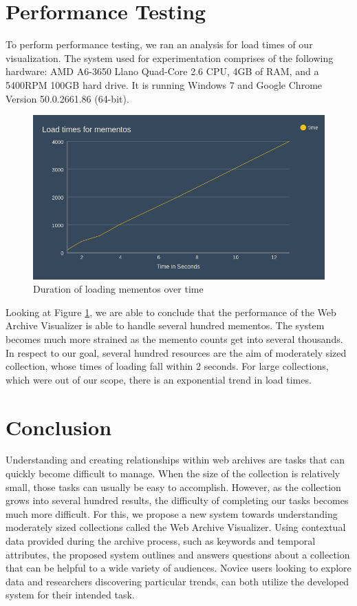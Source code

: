 \documentclass[10pt,journal,compsoc]{IEEEtran}
\begin{document}
\section{Performance Testing}

To perform performance testing, we ran an analysis for load times of our visualization. The system used for experimentation comprises of the following hardware: AMD A6-3650 Llano Quad-Core 2.6 CPU, 4GB of RAM, and a 5400RPM 100GB hard drive. It is running Windows 7 and Google Chrome Version 50.0.2661.86 (64-bit). \par

\begin{figure}[b]
\centering
\includegraphics[scale=0.3]{Figure5}
\caption{Duration of loading mementos over time}
\label{fig:mesh4}
\end{figure}

Looking at Figure \ref{fig:mesh4}, we are able to conclude that the performance of the Web Archive Visualizer is able to handle several hundred mementos. The system becomes much more strained as the memento counts get into several thousands. In respect to our goal, several hundred resources are the aim of moderately sized collection, whose times of loading fall within 2 seconds. For large collections, which were out of our scope, there is an exponential trend in load times. \par

\section{Conclusion}
Understanding and creating relationships within web archives are tasks that can quickly become difficult to manage. When the size of the collection is relatively small, those tasks can usually be easy to accomplish. However, as the collection grows into several hundred results, the difficulty of completing our tasks becomes much more difficult. For this, we propose a new system towards understanding moderately sized collections called the Web Archive Visualizer. Using contextual data provided during the archive process, such as keywords and temporal attributes, the proposed system outlines and answers questions about a collection that can be helpful to a wide variety of audiences. Novice users looking to explore data and researchers discovering particular trends, can both utilize the developed system for their intended task. \par
\end{document}
